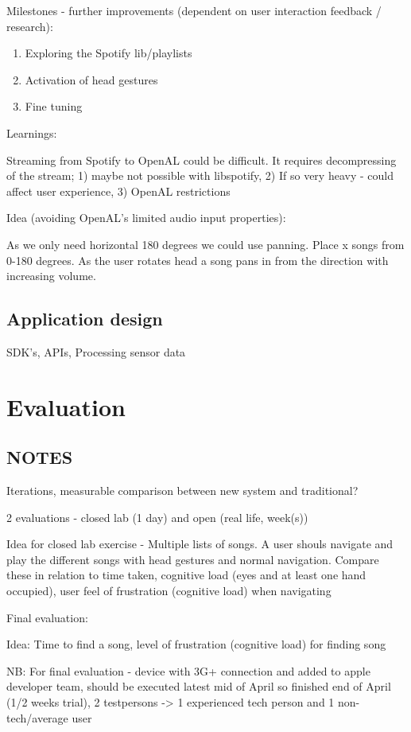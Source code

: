 \documentclass{article}
\begin{document}
Milestones - further improvements (dependent on user interaction feedback / research):
\begin{enumerate}
\item Exploring the Spotify lib/playlists
\item Activation of head gestures
\item Fine tuning
\end{enumerate}

Learnings:

Streaming from Spotify to OpenAL could be difficult. It requires decompressing of the stream; 1) maybe not possible with libspotify, 2) If so very heavy - could affect user experience, 3) OpenAL restrictions

Idea (avoiding OpenAL's limited audio input properties):

As we only need horizontal 180 degrees we could use panning. Place x songs from 0-180 degrees. As the user rotates head a song pans in from the direction with increasing volume.



\subsection{Application design}
SDK's, APIs, Processing sensor data

\section{Evaluation}

\subsection{NOTES}

Iterations, measurable comparison between new system and traditional?

2 evaluations - closed lab (1 day) and open (real life, week(s))

Idea for closed lab exercise - Multiple lists of songs. A user shouls navigate and play the different songs with head gestures and normal navigation. Compare these in relation to time taken, cognitive load (eyes and at least one hand occupied), user feel of frustration (cognitive load) when navigating

Final evaluation:

Idea: Time to find a song, level of frustration (cognitive load) for finding song

NB: For final evaluation - device with 3G+ connection and added to apple developer team, should be executed latest mid of April so finished end of April (1/2 weeks trial), 2 testpersons -> 1 experienced tech person and 1 non-tech/average user
\end{document}
